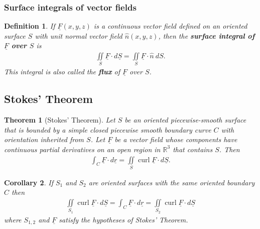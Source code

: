 \documentclass{article}
\theoremstyle{sltheorem}
\newtheorem{definition}{Definition}[section]
\newtheorem{theorem}{Theorem}[section]
\newtheorem{corollary}[theorem]{Corollary}
\newcommand{\R}{\mathbb{R}}
\newcommand{\di}{\iint\limits}
\DeclareMathOperator{\curl}{curl}
\renewcommand{\vec}{\underline}
\newcommand*\B[1]{\textbf{#1}}
\begin{document}
\subsubsection{Surface integrals of vector fields}
\begin{definition}
    If $\vec F(x,y,z)$ is a continuous vector field defined on an oriented surface $S$ with
    unit normal vector field $\hat n(x,y,z)$, then the \B{surface integral of $\vec F$ over 
    $S$} is
    \begin{align*}
        \di_S \vec F\cdot d\vec S = \di_S \vec F\cdot \hat n\:dS.
    \end{align*}
    This integral is also called the \B{flux} of $\vec F$ over $S$.
\end{definition}
\subsection{Stokes' Theorem}
\begin{theorem}[Stokes' Theorem]
    Let $S$ be an oriented piecewise-smooth surface that is bounded by a simple closed
    piecewise smooth boundary curve $C$ with orientation inherited from $S$. Let $\vec F$
    be a vector field whose components have continuous partial derivatives on an open
    region in $\R^3$ that contains $S$. Then
    \begin{align*}
        \int_C \vec F\cdot d\vec r = \di_S \curl \vec F\cdot d\vec S.
    \end{align*} 
\end{theorem}
\begin{corollary}
    If $S_1$ and $S_2$ are oriented surfaces with the same oriented boundary $C$ then
    \begin{align*}
        \di_{S_1}\curl \vec F\cdot d\vec S = \int_C \vec F\cdot d\vec r = \di_{S_2} \curl\vec F\cdot d\vec S
    \end{align*}
    where $S_{1,2}$ and $\vec F$ satisfy the hypotheses of Stokes' Theorem.
\end{corollary}
\end{document}

